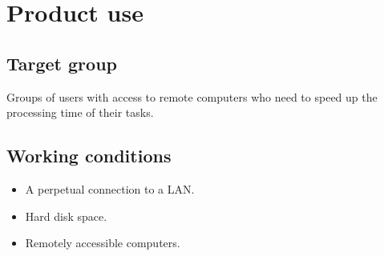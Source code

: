 \section{Product use}

\subsection{Target group}
Groups of users with access to remote computers who need to speed up the processing time of their tasks.

\subsection{Working conditions}
\begin{itemize}
\item A perpetual connection to a LAN.
\item Hard disk space.
\item Remotely accessible computers.
\end{itemize}